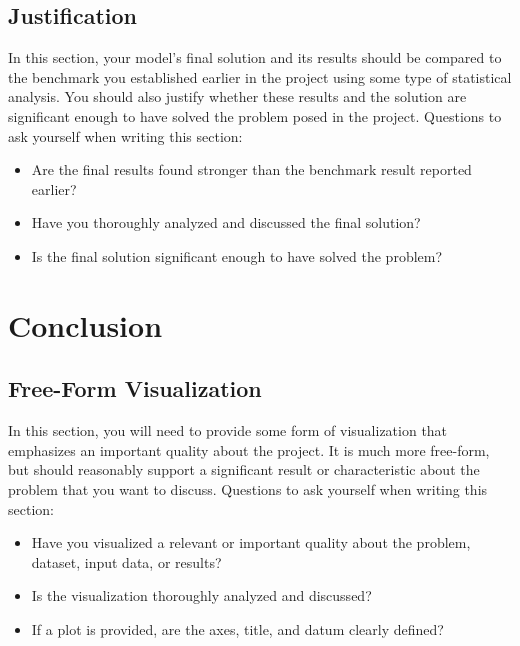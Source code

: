 \documentclass[twoside,openright,titlepage,numbers=noenddot,headinclude,%
               footinclude=true,cleardoublepage=empty,abstractoff,BCOR=5mm,%
               paper=a4,fontsize=11pt,ngerman,american]{scrreprt}
\numberwithin{theorem}{chapter}
\numberwithin{definition}{chapter}
\numberwithin{algorithm}{chapter}
\numberwithin{figure}{chapter}
\numberwithin{table}{chapter}
\numberwithin{equation}{chapter}
\begin{document}
\begin{itemize}
\section*{Justification}
In this section, your model’s final solution and its results should be compared to the benchmark you established earlier in the project using some type of statistical analysis. You should also justify whether these results and the solution are significant enough to have solved the problem posed in the project. Questions to ask yourself when writing this section:
\begin{itemize}%
\item Are the final results found stronger than the benchmark result reported earlier?
\item Have you thoroughly analyzed and discussed the final solution?
\item Is the final solution significant enough to have solved the problem?
\end{itemize}


\chapter*{Conclusion}

\section*{Free-Form Visualization}
In this section, you will need to provide some form of visualization that emphasizes an important quality about the project. It is much more free-form, but should reasonably support a significant result or characteristic about the problem that you want to discuss. Questions to ask yourself when writing this section:
\begin{itemize}%
\item Have you visualized a relevant or important quality about the problem, dataset, input data, or results?
\item Is the visualization thoroughly analyzed and discussed?
\item If a plot is provided, are the axes, title, and datum clearly defined?
\end{itemize}



\end{itemize}
\end{document}
